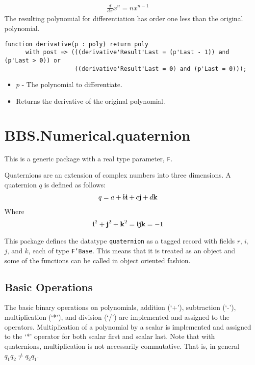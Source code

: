 \documentclass[10pt, openany]{book}
\newcommand{\datatype}[1]{\texttt{#1}}
\newcommand{\uvec}[1]{\textnormal{\bfseries{#1}}}
\begin{document}
\begin{align*}
  \frac{d}{dx}x^n = n x^{n-1}
\end{align*}
The resulting polynomial for differentiation has order one less than the original polynomial.
\begin{lstlisting}
function derivative(p : poly) return poly
      with post => (((derivative'Result'Last = (p'Last - 1)) and (p'Last > 0)) or
                    ((derivative'Result'Last = 0) and (p'Last = 0)));
\end{lstlisting}
\begin{itemize}
  \item $p$ - The polynomial to differentiate.
  \item Returns the derivative of the original polynomial.
\end{itemize}

\section{BBS.Numerical.quaternion}
This is a generic package with a real type parameter, \datatype{F}.

Quaternions are an extension of complex numbers into three dimensions.  A quaternion $q$ is defined as follows:
\begin{align*}
  q=a+b\uvec{i}+c\uvec{j}+d\uvec{k}
\end{align*}
Where
\begin{align*}
  \uvec{i}^2+\uvec{j}^2+\uvec{k}^2=\uvec{i}\uvec{j}\uvec{k}=-1
\end{align*}

This package defines the datatype \datatype{quaternion} as a tagged record with fields $r$, $i$, $j$, and $k$, each of type \datatype{F'Base}.  This means that it is treated as an object and some of the functions can be called in object oriented fashion.

\subsection{Basic Operations}
The basic binary operations on polynomials, addition (`+'), subtraction (`-'), multiplication (`*'), and division (`/') are implemented and assigned to the operators.  Multiplication of a polynomial by a scalar is implemented and assigned to the `*' operator for both scalar first and scalar last.  Note that with quaternions, multiplication is not necessarily commutative.  That is, in general $q_1 q_2 \neq q_2 q_1$.
\end{document}
